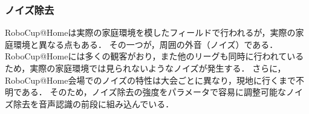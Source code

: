 \documentclass[a4j]{jarticle}
\begin{document}
\subsubsection{ノイズ除去}
RoboCup@Homeは実際の家庭環境を模したフィールドで行われるが，実際の家庭環境と異なる点もある．
その一つが，周囲の外音（ノイズ）である．
RoboCup@Homeには多くの観客がおり，また他のリーグも同時に行われているため，実際の家庭環境では見られないようなノイズが発生する．
さらに，RoboCup@Home会場でのノイズの特性は大会ごとに異なり，現地に行くまで不明である．
そのため，ノイズ除去の強度をパラメータで容易に調整可能なノイズ除去\cite{sainburg2020finding}を音声認識の前段に組み込んでいる．

%
\end{document}
